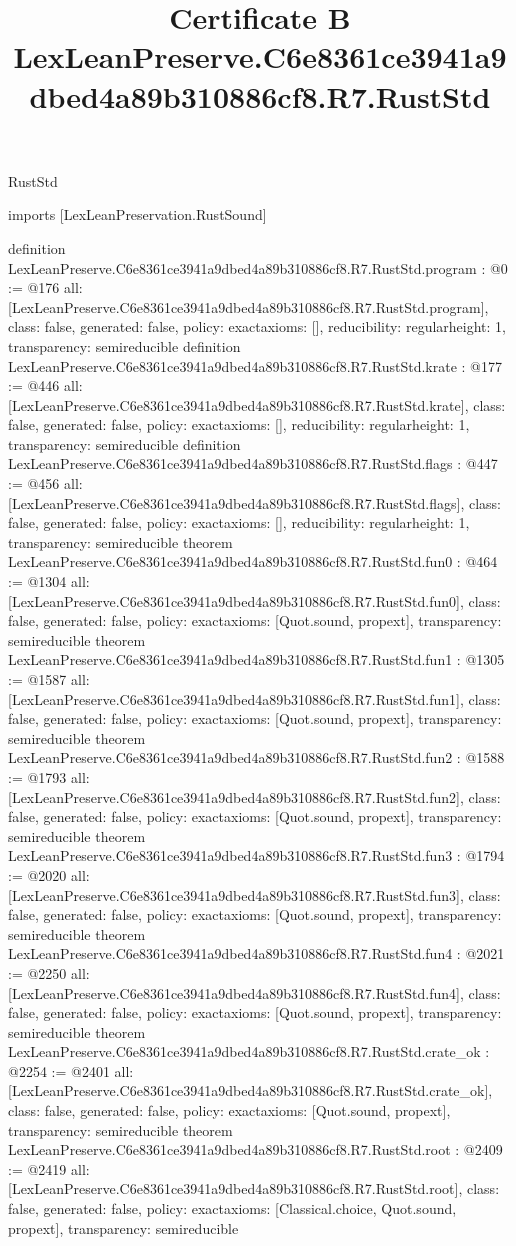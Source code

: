 \begin{lexlean}{RustStd}
\title{Certificate B LexLeanPreserve.C6e8361ce3941a9dbed4a89b310886cf8.R7.RustStd}
\begin{coremodule}
imports [LexLeanPreservation.RustSound]

definition LexLeanPreserve.C6e8361ce3941a9dbed4a89b310886cf8.R7.RustStd.program : @0 := @176 {
  all: [LexLeanPreserve.C6e8361ce3941a9dbed4a89b310886cf8.R7.RustStd.program],
  class: false,
  generated: false,
  policy: exact{axioms: []},
  reducibility: regular{height: 1},
  transparency: semireducible
}
definition LexLeanPreserve.C6e8361ce3941a9dbed4a89b310886cf8.R7.RustStd.krate : @177 := @446 {
  all: [LexLeanPreserve.C6e8361ce3941a9dbed4a89b310886cf8.R7.RustStd.krate],
  class: false,
  generated: false,
  policy: exact{axioms: []},
  reducibility: regular{height: 1},
  transparency: semireducible
}
definition LexLeanPreserve.C6e8361ce3941a9dbed4a89b310886cf8.R7.RustStd.flags : @447 := @456 {
  all: [LexLeanPreserve.C6e8361ce3941a9dbed4a89b310886cf8.R7.RustStd.flags],
  class: false,
  generated: false,
  policy: exact{axioms: []},
  reducibility: regular{height: 1},
  transparency: semireducible
}
theorem LexLeanPreserve.C6e8361ce3941a9dbed4a89b310886cf8.R7.RustStd.fun0 : @464 := @1304 {
  all: [LexLeanPreserve.C6e8361ce3941a9dbed4a89b310886cf8.R7.RustStd.fun0],
  class: false,
  generated: false,
  policy: exact{axioms: [Quot.sound, propext]},
  transparency: semireducible
}
theorem LexLeanPreserve.C6e8361ce3941a9dbed4a89b310886cf8.R7.RustStd.fun1 : @1305 := @1587 {
  all: [LexLeanPreserve.C6e8361ce3941a9dbed4a89b310886cf8.R7.RustStd.fun1],
  class: false,
  generated: false,
  policy: exact{axioms: [Quot.sound, propext]},
  transparency: semireducible
}
theorem LexLeanPreserve.C6e8361ce3941a9dbed4a89b310886cf8.R7.RustStd.fun2 : @1588 := @1793 {
  all: [LexLeanPreserve.C6e8361ce3941a9dbed4a89b310886cf8.R7.RustStd.fun2],
  class: false,
  generated: false,
  policy: exact{axioms: [Quot.sound, propext]},
  transparency: semireducible
}
theorem LexLeanPreserve.C6e8361ce3941a9dbed4a89b310886cf8.R7.RustStd.fun3 : @1794 := @2020 {
  all: [LexLeanPreserve.C6e8361ce3941a9dbed4a89b310886cf8.R7.RustStd.fun3],
  class: false,
  generated: false,
  policy: exact{axioms: [Quot.sound, propext]},
  transparency: semireducible
}
theorem LexLeanPreserve.C6e8361ce3941a9dbed4a89b310886cf8.R7.RustStd.fun4 : @2021 := @2250 {
  all: [LexLeanPreserve.C6e8361ce3941a9dbed4a89b310886cf8.R7.RustStd.fun4],
  class: false,
  generated: false,
  policy: exact{axioms: [Quot.sound, propext]},
  transparency: semireducible
}
theorem LexLeanPreserve.C6e8361ce3941a9dbed4a89b310886cf8.R7.RustStd.crate_ok : @2254 := @2401 {
  all: [LexLeanPreserve.C6e8361ce3941a9dbed4a89b310886cf8.R7.RustStd.crate_ok],
  class: false,
  generated: false,
  policy: exact{axioms: [Quot.sound, propext]},
  transparency: semireducible
}
theorem LexLeanPreserve.C6e8361ce3941a9dbed4a89b310886cf8.R7.RustStd.root : @2409 := @2419 {
  all: [LexLeanPreserve.C6e8361ce3941a9dbed4a89b310886cf8.R7.RustStd.root],
  class: false,
  generated: false,
  policy: exact{axioms: [Classical.choice, Quot.sound, propext]},
  transparency: semireducible
}


\end{coremodule}
\end{lexlean}
